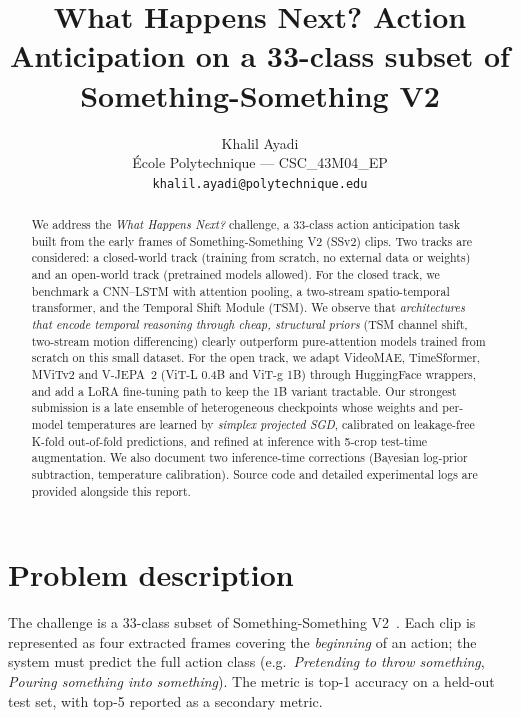 \documentclass[10pt,twocolumn,letterpaper]{article}
\begin{document}
\title{What Happens Next? Action Anticipation on a 33-class subset of Something-Something V2}

\author{Khalil Ayadi\\
\'Ecole Polytechnique --- CSC\_43M04\_EP\\
{\tt\small khalil.ayadi@polytechnique.edu}
}

\maketitle

\begin{abstract}
We address the \emph{What Happens Next?} challenge, a 33-class action
anticipation task built from the early frames of Something-Something V2
(SSv2) clips. Two tracks are considered: a closed-world track (training
from scratch, no external data or weights) and an open-world track
(pretrained models allowed). For the closed track, we benchmark a
CNN--LSTM with attention pooling, a two-stream spatio-temporal
transformer, and the Temporal Shift Module (TSM). We observe that
\emph{architectures that encode temporal reasoning through cheap,
structural priors} (TSM channel shift, two-stream motion differencing)
clearly outperform pure-attention models trained from scratch on this
small dataset. For the open track, we adapt VideoMAE, TimeSformer,
MViTv2 and V-JEPA~2 (ViT-L 0.4B and ViT-g 1B) through HuggingFace
wrappers, and add a LoRA fine-tuning path to keep the 1B variant
tractable. Our strongest submission is a late ensemble of heterogeneous
checkpoints whose weights and per-model temperatures are learned by
\emph{simplex projected SGD}, calibrated on leakage-free K-fold
out-of-fold predictions, and refined at inference with 5-crop
test-time augmentation. We also document two inference-time corrections
(Bayesian log-prior subtraction, temperature calibration). Source code
and detailed experimental logs are provided alongside this report.
\end{abstract}

\section{Problem description}

The challenge is a 33-class subset of Something-Something V2~\cite{Goyal17}.
Each clip is represented as four extracted frames covering the
\emph{beginning} of an action; the system must predict the full action
class (e.g.~\textit{Pretending to throw something}, \textit{Pouring
something into something}). The metric is top-1 accuracy on a held-out
test set, with top-5 reported as a secondary metric.
\end{document}
